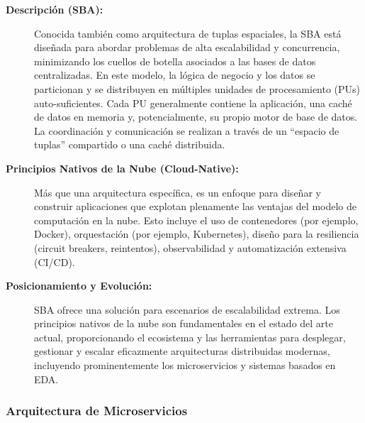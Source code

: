 \begin{description}
    \item[\textbf{Descripción (SBA):}] Conocida también como arquitectura de tuplas espaciales, la SBA está diseñada para abordar problemas de alta escalabilidad y concurrencia, minimizando los cuellos de botella asociados a las bases de datos centralizadas. En este modelo, la lógica de negocio y los datos se particionan y se distribuyen en múltiples unidades de procesamiento (PUs) auto-suficientes. Cada PU generalmente contiene la aplicación, una caché de datos en memoria y, potencialmente, su propio motor de base de datos. La coordinación y comunicación se realizan a través de un ``espacio de tuplas'' compartido o una caché distribuida.
    \item[\textbf{Principios Nativos de la Nube (Cloud-Native):}] Más que una arquitectura específica, es un enfoque para diseñar y construir aplicaciones que explotan plenamente las ventajas del modelo de computación en la nube. Esto incluye el uso de contenedores (por ejemplo, Docker), orquestación (por ejemplo, Kubernetes), diseño para la resiliencia (circuit breakers, reintentos), observabilidad y automatización extensiva (CI/CD).
    \item[\textbf{Posicionamiento y Evolución:}] SBA ofrece una solución para escenarios de escalabilidad extrema. Los principios nativos de la nube son fundamentales en el estado del arte actual, proporcionando el ecosistema y las herramientas para desplegar, gestionar y escalar eficazmente arquitecturas distribuidas modernas, incluyendo prominentemente los microservicios y sistemas basados en EDA.
\end{description}

\subsubsection*{Arquitectura de Microservicios}

